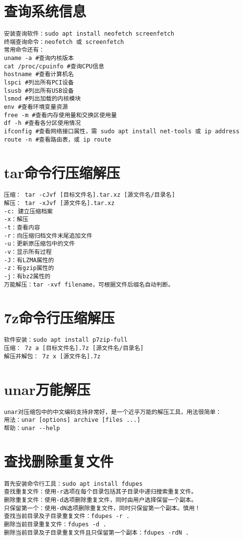\documentclass[a4paper,fontset=fandol,zihao=-4,linespread=1.2]{ctexbook}
\begin{document}
\section{查询系统信息}
\begin{lstlisting}
安装查询软件：sudo apt install neofetch screenfetch
终端查询命令：neofetch 或 screenfetch
常用命令还有：
uname -a #查询内核版本
cat /proc/cpuinfo #查询CPU信息
hostname #查看计算机名
lspci #列出所有PCI设备
lsusb #列出所有USB设备
lsmod #列出加载的内核模块
env #查看环境变量资源
free -m #查看内存使用量和交换区使用量
df -h #查看各分区使用情况
ifconfig #查看网络接口属性，需 sudo apt install net-tools 或 ip address
route -n #查看路由表，或 ip route
\end{lstlisting}

\section{tar命令行压缩解压}
\begin{lstlisting}
压缩： tar -cJvf [目标文件名].tar.xz [源文件名/目录名]
解压： tar -xJvf [源文件名].tar.xz
-c: 建立压缩档案
-x：解压
-t：查看内容
-r：向压缩归档文件末尾追加文件
-u：更新原压缩包中的文件
-v：显示所有过程
-J：有LZMA属性的
-z：有gzip属性的
-j：有bz2属性的
万能解压：tar -xvf filename，可根据文件后缀名自动判断。
\end{lstlisting}

\section{7z命令行压缩解压}
\begin{lstlisting}
软件安装：sudo apt install p7zip-full
压缩： 7z a [目标文件名].7z [源文件名/目录名]
解压并解包： 7z x [源文件名].7z
\end{lstlisting}

\section{unar万能解压}
\begin{lstlisting}
unar对压缩包中的中文编码支持非常好，是一个近乎万能的解压工具，用法很简单：
用法：unar [options] archive [files ...]
帮助：unar --help
\end{lstlisting}

\section{查找删除重复文件}
\begin{lstlisting}
首先安装命令行工具：sudo apt install fdupes
查找重复文件：使用-r选项在每个目录包括其子目录中递归搜索重复文件。
删除重复文件：使用-d选项删除重复文件，同时由用户选择保留一个副本。
只保留第一个：使用-dN选项删除重复文件，同时只保留第一个副本。慎用！
查找当前目录及子目录重复文件：fdupes -r .
删除当前目录重复文件：fdupes -d .
删除当前目录及子目录重复文件且只保留第一个副本：fdupes -rdN .
\end{lstlisting}
\end{document}
